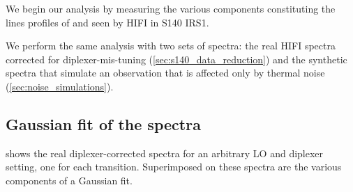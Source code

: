 We begin our analysis by measuring the various components constituting the lines profiles of  and  seen by HIFI in S140 IRS1.

We perform the same analysis with two sets of spectra:
the real HIFI spectra corrected for diplexer-mis-tuning (\cref{sec:s140_data_reduction})
and
the synthetic spectra that simulate an observation that is affected only by thermal noise (\cref{sec:noise_simulations}).


\FloatBarrier
\subsection{Gaussian fit of the spectra}
\label{sec:chp5_gaussian_model}
 shows the real diplexer-corrected spectra for an arbitrary LO and diplexer setting, one for each transition.
Superimposed on these spectra are the various components of a Gaussian fit.

